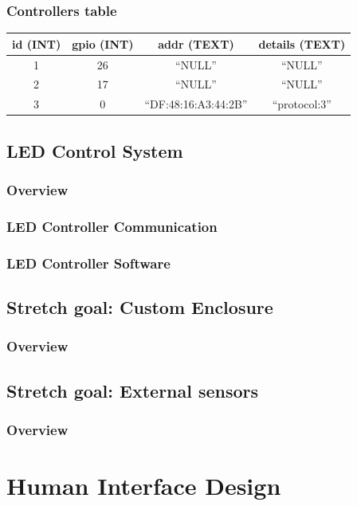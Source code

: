 \documentclass[onecolumn, draftclsnofoot,10pt, compsoc]{IEEEtran}
\begin{document}
			\subsubsection{Controllers table}
				\begin{tabular}{ |c|c|c|c| }
					\hline
					id (INT) & gpio (INT) & addr (TEXT) & details (TEXT) \\
					\hline
					1 & 26 & ``NULL'' & ``NULL'' \\
					2 & 17 & ``NULL'' & ``NULL'' \\
					3 & 0 & ``DF:48:16:A3:44:2B'' & ``protocol:3'' \\
					\hline
				\end{tabular}


		\subsection{LED Control System}
			\subsubsection{Overview}
			\subsubsection{LED Controller Communication}
			\subsubsection{LED Controller Software}

		\subsection{Stretch goal: Custom Enclosure}
			\subsubsection{Overview}
		\subsection{Stretch goal: External sensors}
			\subsubsection{Overview}

	\section{Human Interface Design}
\end{document}
